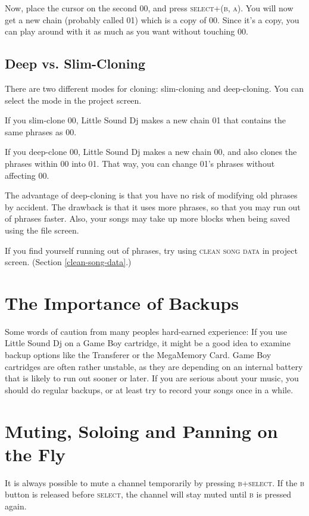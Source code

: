 Now, place the cursor on the second 00, and press \textsc{select+(b, a)}.
You will now get a new chain (probably called 01) which is a copy of 00. Since it's a copy, you can play around with it as much as you want without touching 00.

\subsection{Deep vs. Slim-Cloning}

There are two different modes for cloning: slim-cloning and deep-cloning. You can select the mode in the project screen.

If you slim-clone 00, Little Sound Dj makes a new chain 01 that
contains the same phrases as 00.

If you deep-clone 00, Little Sound Dj makes a new chain 00, and
also clones the phrases within 00 into 01. That way,
you can change 01's phrases without affecting 00.

The advantage of deep-cloning is that you have no risk of modifying old phrases by accident. The drawback is that it uses more phrases, so that you may run out of phrases faster. Also, your songs may take up more blocks when being saved using the file screen.

If you find yourself running out of phrases, try using \textsc{clean song data} in project screen. (Section \ref{clean-song-data}.)

\section{The Importance of Backups}

Some words of caution from many peoples hard-earned experience: If you use Little Sound Dj on a Game Boy cartridge, it might be a good idea to examine backup options like the Transferer or the MegaMemory Card. Game Boy cartridges are often rather unstable, as they are depending on an internal battery that is likely to run out sooner or later. If you are serious about your music, you should do regular backups, or at least try to record your songs once in a while.

\section{Muting, Soloing and Panning on the Fly}

It is always possible to mute a channel temporarily by pressing \textsc{b+select}. If the \textsc{b} button is released before \textsc{select}, the channel will stay muted until \textsc{b} is pressed again.

